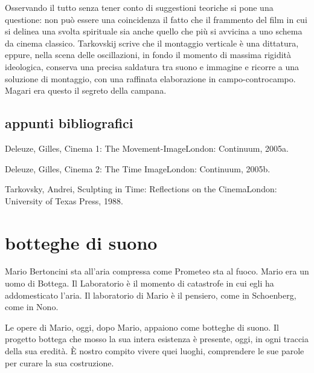 Osservando il tutto senza tener conto di suggestioni teoriche si pone una questione: non può essere una coincidenza il fatto che il frammento del film in cui si delinea una svolta spirituale sia anche quello che più si avvicina a uno schema da cinema classico. Tarkovskij scrive che il montaggio verticale è una dittatura, eppure, nella scena delle oscillazioni, in fondo il momento di massima rigidità ideologica, conserva una precisa saldatura tra suono e immagine e ricorre a una soluzione di montaggio, con una raffinata elaborazione in campo-controcampo. Magari era questo il segreto della campana.


\subsection*{appunti bibliografici}

Deleuze, Gilles, Cinema 1: The Movement-ImageLondon: Continuum, 2005a.

Deleuze, Gilles, Cinema 2: The Time ImageLondon: Continuum, 2005b.

Tarkovsky, Andrei, Sculpting in Time: Reflections on the CinemaLondon: University of Texas Press, 1988.

\section*{botteghe di suono}


Mario Bertoncini sta all'aria compressa come Prometeo sta al fuoco. Mario era un
uomo di Bottega. Il Laboratorio è il momento di catastrofe in cui egli ha
addomesticato l'aria. Il laboratorio di Mario è il pensiero, come in Schoenberg,
come in Nono.

Le opere di Mario, oggi, dopo Mario, appaiono come botteghe di suono. Il
progetto bottega che mosso la sua intera esistenza è presente, oggi, in ogni
traccia della sua eredità. È nostro compito vivere quei luoghi, comprendere le
sue parole per curare la sua costruzione.
